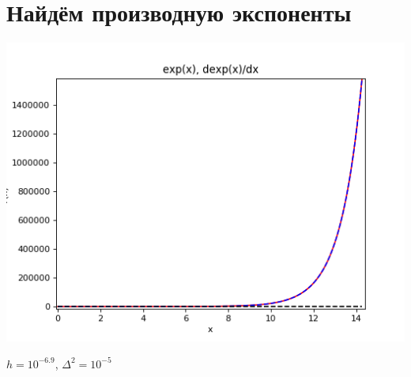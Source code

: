 \documentclass[12pt,a4paper]{scrartcl}
\begin{document}
	\section{Найдём производную экспоненты }
		\begin{center}
			\includegraphics[scale=0.73]{figure_2} \\
		\end{center}
	$h = 10^{-6.9}$, $\Delta^2 = 10^{-5}$
\end{document}
